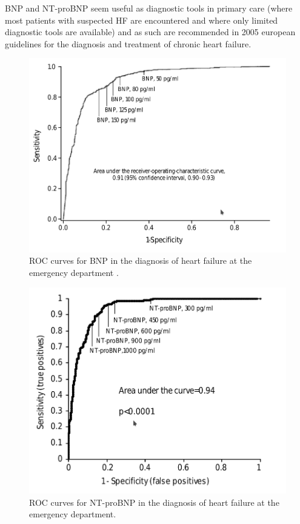 \documentclass[14pt,a4paper,onecolumn]{extarticle}
\begin{document}
BNP and NT-proBNP seem useful as diagnostic tools in primary care (where most patients with suspected HF are encountered and where only limited diagnostic tools are available) and as such are recommended in 2005 european guidelines for the diagnosis and treatment of chronic heart failure. \citep{Swedberg2005}

\begin{figure}      \centering      \includegraphics[scale=0.4]{../../images/BNP_ER.png}      \small\caption{ROC curves for BNP in the diagnosis of heart failure at the emergency department \citep{Januzzi2005}.}      \label{BNP_ER}  \end{figure}

\begin{figure}     \centering     \includegraphics[scale=0.4]{../../images/NTBNP_ER.png}     \small\caption{ROC curves for NT-proBNP in the diagnosis of heart failure at the emergency department.\citep{Januzzi2005}}     \label{NTBNP_ER} \end{figure}
\end{document}
